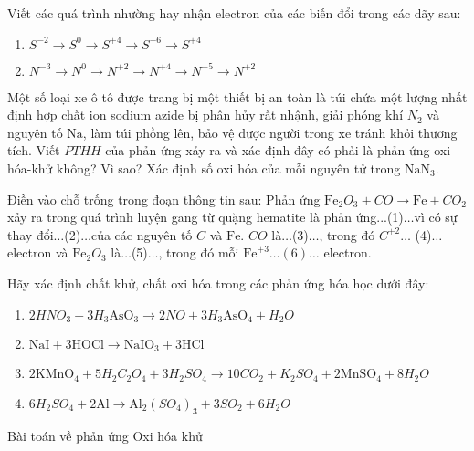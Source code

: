 \begin{bt}
	Viết các quá trình nhường hay nhận electron của các biến đổi trong các dãy sau:
	\begin{enumerate}
		\item $S^{-2} \to S^0\to S^{+4} \to S^{+6} \to S^{+4}$
		\item $N^{-3} \to N^0\to N^{+2} \to N^{+4} \to N^{+5} \to N^{+2}$
	\end{enumerate}
	\loigiai{}
\end{bt}
\begin{bt}
	Một số loại xe ô tô được trang bị một thiết bị an toàn là túi chứa một lượng nhất định hợp chất ion sodium azide bị phân hủy rất nhậnh, giải phóng khí $N_2$ và nguyên tố $\mathrm{Na}$, làm túi phồng lên, bảo vệ được người trong xe tránh khỏi thương tích. Viết $PTHH$ của phản ứng xảy ra và xác định đây có phải là phản ứng oxi hóa-khử không? Vì sao? Xác định số oxi hóa của mỗi nguyên tử trong $\mathrm{NaN}_3$.
	\loigiai{}
\end{bt}
\begin{bt}
	Điền vào chỗ trống trong đoạn thông tin sau:
	Phản ứng $\mathrm{Fe}_2O_3+CO \to \mathrm{Fe}+CO_2$ xảy ra trong quá trình luyện gang từ quặng hematite là phản ứng...(1)$\ldots$vì có sự thay đổi$\ldots$(2)$\ldots$của các nguyên tố $C$ và $\mathrm{Fe}$. $CO$ là$\ldots$(3)$\ldots$, trong đó $C^{+2} \ldots$ (4)$\ldots$electron và $\mathrm{Fe}_2O_3$ là$\ldots$(5)$\ldots$, trong đó mỗi $\mathrm{Fe}^{+3} \ldots(6) \ldots$ electron.
	\loigiai{}
\end{bt}
\begin{bt}[][][]
	Hãy xác định chất khử, chất oxi hóa trong các phản ứng hóa học dưới đây:
	\begin{enumerate}
		\item $2HNO_3+3H_3\mathrm{AsO}_3\to 2NO+3H_3\mathrm{AsO}_4+H_2O$
		\item $\mathrm{NaI}+3\mathrm{HOCl} \to \mathrm{NaIO}_3+3\mathrm{HCl}$
		\item $2\mathrm{KMnO}_4+5H_2C_2O_4+3H_2SO_4\to 10CO_2+K_2SO_4+2\mathrm{MnSO}_4+8H_2O$
		\item $6H_2SO_4+2\mathrm{Al} \to \mathrm{Al}_2\left(SO_4\right)_3+3SO_2+6H_2O$
	\end{enumerate}
	\loigiai{}
\end{bt}


\begin{dangNTD}{Bài toán về phản ứng Oxi hóa khử}
\end{dangNTD}
\begin{vdm}
\end{vdm}
\begin{vd}
	
	\loigiai{}
\end{vd}


